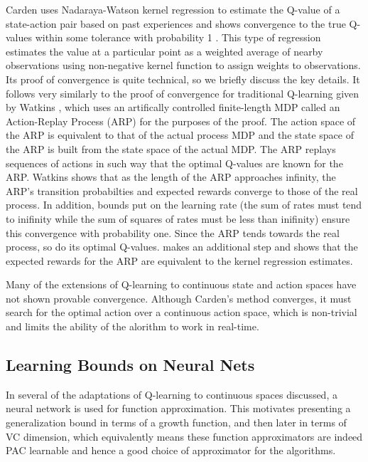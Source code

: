 \documentclass{article} %
\begin{document}
Carden uses Nadaraya-Watson kernel regression \cite{nadaraya} to estimate the Q-value of a state-action pair based on past experiences and shows convergence to the true Q-values within some tolerance with probability 1 \cite{carden2014}.  This type of regression estimates the value at a particular point as a weighted average of nearby observations using non-negative kernel function to assign weights to observations.  Its proof of convergence is quite technical, so we briefly discuss the key details.  It follows very similarly to the proof of convergence for traditional Q-learning given by Watkins \cite{watkins}, which uses an artifically controlled finite-length MDP called an Action-Replay Process (ARP) for the purposes of the proof.  The action space of the ARP is equivalent to that of the actual process MDP and the state space of the ARP is built from the state space of the actual MDP. The ARP replays sequences of actions in such way that the optimal Q-values are known for the ARP. Watkins shows that as the length of the ARP approaches infinity, the ARP's transition probabilties and expected rewards converge to those of the real process.  In addition, bounds put on the learning rate (the sum of rates must tend to inifinity while the sum of squares of rates must be less than inifinity) ensure this convergence with probability one.  Since the ARP tends towards the real process, so do its optimal Q-values.  \cite{carden2014} makes an additional step and shows that the expected rewards for the ARP are equivalent to the kernel regression estimates.

Many of the extensions of Q-learning to continuous state and action spaces have not shown provable convergence.  Although Carden's method converges, it must search for the optimal action over a continuous action space, which is non-trivial and limits the ability of the alorithm to work in real-time.

\subsection{Learning Bounds on Neural Nets}
 In several of the adaptations of Q-learning to continuous spaces discussed, a neural network is used for function approximation.  This motivates presenting a generalization bound in terms of a growth function, and then later in terms of VC dimension, which equivalently means these function approximators are indeed PAC learnable and hence a good choice of approximator for the algorithms.
 
\end{document}
